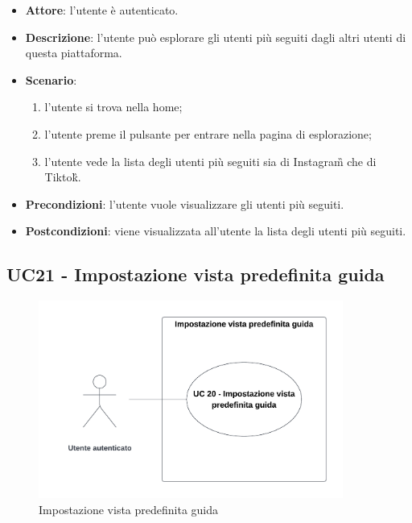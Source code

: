 \begin{itemize}
    \item \textbf{Attore}: l'utente è autenticato.
    \item \textbf{Descrizione}: l'utente può esplorare gli utenti più seguiti dagli altri utenti di questa piattaforma.
    \item \textbf{Scenario}:
    \begin{enumerate}
        \item l'utente si trova nella home;
        \item l'utente preme il pulsante per entrare nella pagina di esplorazione;
        \item l'utente vede la lista degli utenti più seguiti sia di Instagram\G{} che di Tiktok\G{}.
    \end{enumerate}

    \item \textbf{Precondizioni}: l'utente vuole visualizzare gli utenti più seguiti.
    \item \textbf{Postcondizioni}: viene visualizzata all'utente la lista degli utenti più seguiti.
\end{itemize}

\subsection{UC21 - Impostazione vista predefinita guida}

\begin{figure}[!h]
    \includegraphics[width=10cm]{sezioni/Images/UC20.png}
    \centering
    \caption{Impostazione vista predefinita guida}
\end{figure}

